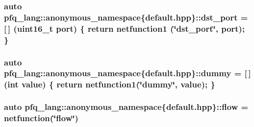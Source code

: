 \hypertarget{namespacepfq__lang_1_1anonymous__namespace_02default_8hpp_03_aceccbe6ec912638fb8d5d3d9e0372a09}{
\subsubsection[{dst\-\_\-port}]{\setlength{\rightskip}{0pt plus 5cm}auto pfq\-\_\-lang\-::anonymous\-\_\-namespace\{default.\-hpp\}\-::dst\-\_\-port = \mbox{[}$\,$\mbox{]} (uint16\-\_\-t {\bf port}) \{ return {\bf netfunction1} (\char`\"{}dst\-\_\-port\char`\"{}, port); \}}}\label{namespacepfq__lang_1_1anonymous__namespace_02default_8hpp_03_aceccbe6ec912638fb8d5d3d9e0372a09}
\hypertarget{namespacepfq__lang_1_1anonymous__namespace_02default_8hpp_03_a876b4be1c6cf97e317f74242d8fb3da4}{
\subsubsection[{dummy}]{\setlength{\rightskip}{0pt plus 5cm}auto pfq\-\_\-lang\-::anonymous\-\_\-namespace\{default.\-hpp\}\-::dummy = \mbox{[}$\,$\mbox{]} (int value) \{ return {\bf netfunction1}(\char`\"{}dummy\char`\"{}, value); \}}}\label{namespacepfq__lang_1_1anonymous__namespace_02default_8hpp_03_a876b4be1c6cf97e317f74242d8fb3da4}
\hypertarget{namespacepfq__lang_1_1anonymous__namespace_02default_8hpp_03_a90497b962aed613834286418cd7ea722}{
\subsubsection[{flow}]{\setlength{\rightskip}{0pt plus 5cm}auto pfq\-\_\-lang\-::anonymous\-\_\-namespace\{default.\-hpp\}\-::flow = {\bf netfunction}(\char`\"{}flow\char`\"{})}}\label{namespacepfq__lang_1_1anonymous__namespace_02default_8hpp_03_a90497b962aed613834286418cd7ea722}
